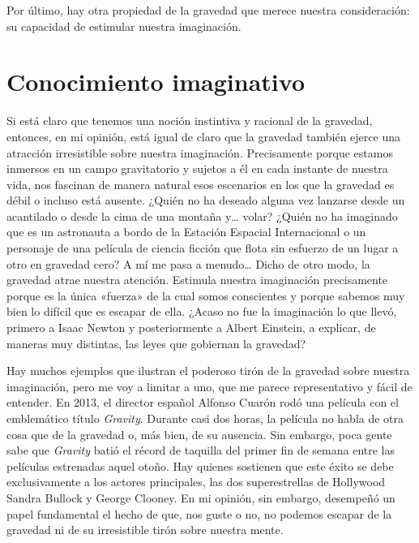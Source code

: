 Por último, hay otra propiedad de la gravedad que merece nuestra consideración: su
capacidad de estimular nuestra imaginación.

\section{Conocimiento imaginativo}\label{sec:01-imaginative}

Si está claro que tenemos una noción instintiva y racional de la gravedad, entonces,
en mi opinión, está igual de claro que la gravedad también ejerce una atracción
irresistible sobre nuestra imaginación. Precisamente porque estamos inmersos en un
campo gravitatorio y sujetos a él en cada instante de nuestra vida, nos fascinan de
manera natural esos escenarios en los que la gravedad es débil o incluso está ausente.
¿Quién no ha deseado alguna vez lanzarse desde un acantilado o desde la cima de una
montaña y… volar? ¿Quién no ha imaginado que es un astronauta a bordo de la Estación
Espacial Internacional o un personaje de una película de ciencia ficción que flota sin
esfuerzo de un lugar a otro en gravedad cero? A mí me pasa a menudo… Dicho de otro
modo, la gravedad atrae nuestra atención. Estimula nuestra imaginación precisamente
porque es la única «fuerza» de la cual somos conscientes y porque sabemos muy bien lo
difícil que es escapar de ella. ¿Acaso no fue la imaginación lo que llevó, primero a
Isaac Newton y posteriormente a Albert Einstein,
a explicar, de maneras muy distintas, las leyes que gobiernan la gravedad?

Hay muchos ejemplos que ilustran el poderoso tirón de la gravedad sobre nuestra
imaginación, pero me voy a limitar a uno, que me parece representativo y fácil de
entender. En 2013, el director español Alfonso
Cuarón
rodó una película con el emblemático título \emph{Gravity}. Durante casi dos horas,
la película no habla de otra cosa que de la gravedad o, más bien, de su ausencia.
Sin embargo, poca gente sabe que \emph{Gravity} batió el récord de taquilla del primer
fin de semana entre las películas estrenadas aquel otoño. Hay quienes sostienen que
este éxito se debe exclusivamente a los actores principales, las dos superestrellas
de Hollywood Sandra Bullock y George Clooney. En mi opinión, sin embargo, desempeñó
un papel fundamental el hecho de que, nos guste o no, no podemos escapar de la gravedad
ni de su irresistible tirón sobre nuestra mente.

